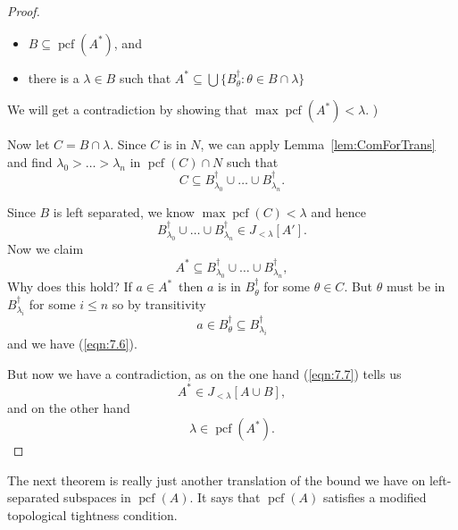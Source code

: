 \documentclass[10pt]{amsart}
\theoremstyle{plain}
\theoremstyle{definition}
\theoremstyle{remark}
\DeclareMathOperator{\pcf}{pcf}
\numberwithin{equation}{section}
\begin{document}
\begin{proof}
\begin{itemize}
\item  $B\subseteq\pcf(A^*)$, and
\item there is a $\lambda\in B$ such that $A^*\subseteq \bigcup \{B^\dagger_\theta:\theta\in B\cap\lambda\}$
\end{itemize}
We will get a contradiction by showing that $\max\pcf(A^*)<\lambda$.
)

Now let $C = B\cap \lambda$. Since $C$ is in $N$, we can apply Lemma~\ref{lem:ComForTrans} and find $\lambda_0>\dots>\lambda_n$
in $\pcf(C)\cap N$ such that
\begin{equation}
C\subseteq B^\dagger_{\lambda_0}\cup\dots\cup B^\dagger_{\lambda_n}.
\end{equation}

Since $B$ is left separated, we know $\max\pcf(C)<\lambda$ and hence
\begin{equation}
\label{eqn:7.7}
B^\dagger_{\lambda_0}\cup\dots\cup B^\dagger_{\lambda_n}\in J_{<\lambda}[A'].
\end{equation}
Now we claim
\label{eqn:7.6}
\begin{equation}
A^*\subseteq B^\dagger_{\lambda_0}\cup\dots\cup B^\dagger_{\lambda_n},
\end{equation}
Why does this hold?  If $a\in A^*$\, then
$a$ is in $B^\dagger_\theta$ for some $\theta\in C$.  But $\theta$ must be in $B^{\dagger}_{\lambda_i}$ for some $i\leq n$ so by
transitivity
\begin{equation}
a\in B^\dagger_\theta\subseteq B^\dagger_{\lambda_i}
\end{equation}
and we have (\ref{eqn:7.6}).

But now we have a contradiction, as on the one hand (\ref{eqn:7.7}) tells us
\begin{equation}
A^*\in J_{<\lambda}[A\cup B],
\end{equation}
and on the other hand
\begin{equation}
\lambda\in\pcf(A^*).
\end{equation}



\end{proof}

The next theorem is really just another translation of the bound we have on left-separated subspaces in $\pcf(A)$.  It says that $\pcf(A)$
satisfies a modified topological tightness condition.
\end{document}
